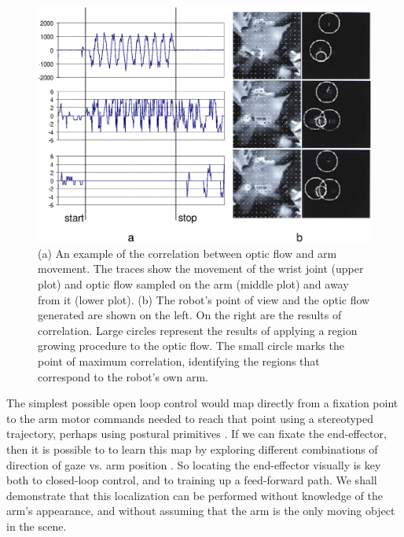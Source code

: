 \begin{figure}[tb]
\begin{center}
\includegraphics[width=12cm]{arm-detection-all.eps}
\caption{ 
\label{fig:arm-detection}
%
(a) An example of the correlation between optic flow and arm movement.
The traces show the movement of the wrist joint (upper plot)
and optic flow sampled on the arm (middle plot) and away from it (lower
plot). (b) The robot's point of view and the optic flow generated are 
shown on the left. On the right are the results of correlation.  
Large circles represent the results of applying a region growing 
procedure to the optic flow. The small circle marks the point of maximum 
correlation, identifying the regions that correspond to the robot's own arm.
%
}
\end{center}
\end{figure}


The simplest possible open loop control would map directly from a
fixation point to the arm motor commands needed to reach that point
\cite{metta99developmental} using a stereotyped trajectory, perhaps
using postural primitives \cite{mussa-ivaldi92vector}.  If we can
fixate the end-effector, then it is possible to to learn this map by
exploring different combinations of direction of gaze vs.  arm
position \cite{Marjanovic-96-SAB,metta99developmental}.  So locating
the end-effector visually is key both to closed-loop control, and to
training up a feed-forward path.  We shall demonstrate that this
localization can be performed without knowledge of the arm's appearance,
and without assuming that the arm is the only moving object in the
scene.

